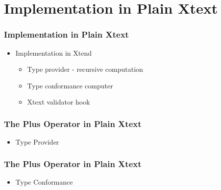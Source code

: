 \def \tyPlain {Implementation in Plain Xtext}
\def \tyPlusPlain {The Plus Operator in Plain Xtext}
\section[Plain Xtext]{\tyPlain}

\begin{frame}
  \tableofcontents[currentsection]
\end{frame}

\begin{frame}[fragile]
  \frametitle{\tyPlain}
  \begin{itemize}
    \item Implementation in Xtend
    \begin{itemize}
      \item Type provider - recursive computation
      \item Type conformance computer
      \item Xtext validator hook
    \end{itemize}
  \end{itemize}
\end{frame}


\begin{frame}[fragile]
  \frametitle{\tyPlusPlain}
  \begin{itemize}
    \item Type Provider 
  \end{itemize}

  \begin{footnotesize}
    
  \end{footnotesize}
\end{frame}

\begin{frame}[fragile]
  \frametitle{\tyPlusPlain}
  \begin{itemize}
    \item Type Conformance 
  \end{itemize}

  \begin{footnotesize}
    
  \end{footnotesize}
\end{frame}